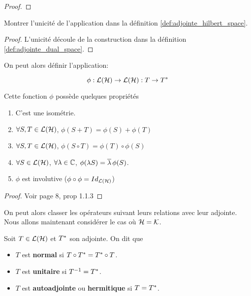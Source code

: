 \begin{proof}

\end{proof}

\begin{proposition}
	Montrer l'unicité de l'application dans la définition
	\ref{def:adjointe_hilbert_space}.
\end{proposition}

\begin{proof}
	L'unicité découle de la construction dans la définition
	\ref{def:adjointe_dual_space}.
\end{proof}

On peut alors définir l'application:

\begin{equation}
	\phi : \mathcal{L}(\mathcal{H}) \rightarrow \mathcal{L}(\mathcal{H}) : T \rightarrow
	T^{*}
\end{equation}

Cette fonction $\phi$ possède quelques propriétés

\begin{proposition}
\begin{enumerate}
	\item C'est une isométrie.
	\item $\forall S, T \in \mathcal{L}(\mathcal{H})$, $\phi(S + T) =
		\phi(S) + \phi(T)$
	\item $\forall S, T \in \mathcal{L}(\mathcal{H})$, $\phi(S \circ T) = \phi(T)
		\circ \phi(S)$
	\item $\forall S \in \mathcal{L}(\mathcal{H})$, $\forall \lambda \in
		\mathbb{C}$, $\phi(\lambda S) = \overline{\lambda} \, \phi(S)$.
	\item $\phi$ est involutive ($\phi \circ \phi =
		Id_{\mathcal{L}(\mathcal{H})}$)
\end{enumerate}
\end{proposition}

\begin{proof}
	Voir page 8, prop 1.1.3
\end{proof}

On peut alors classer les opérateurs suivant leurs relations avec leur adjointe.
Nous allons maintenant considérer le cas où $\mathcal{H} = \mathcal{K}$.

\begin{definition}
	Soit $T \in \mathcal{L}(\mathcal{H})$ et $T^{*}$ son adjointe. On
	dit que
	\begin{itemize}
		\item $T$ est \textbf{normal} si $T \circ T^{*} = T^{*}
			\circ T$.
		\item $T$ est \textbf{unitaire} si $T^{-1} = T^{*}$.
		\item $T$ est \textbf{autoadjointe} ou \textbf{hermitique} si $T =
			T^{*}$.
	\end{itemize}
\end{definition}

